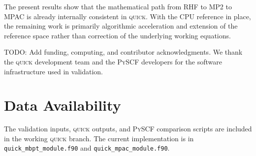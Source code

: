 \documentclass[aip,jcp,reprint,superscriptaddress]{revtex4-2}
\newcommand{\quick}{\textsc{quick}}
\newcommand{\pyscf}{\textsc{PySCF}}
\newcommand{\keyword}[1]{\texttt{#1}}
\begin{document}
The present results show that the mathematical path from RHF to MP2 to MPAC is already internally consistent in \quick{}.  With the CPU reference in place, the remaining work is primarily algorithmic acceleration and extension of the reference space rather than correction of the underlying working equations.

\begin{acknowledgments}
TODO: Add funding, computing, and contributor acknowledgments.  We thank the \quick{} development team and the \pyscf{} developers for the software infrastructure used in validation.
\end{acknowledgments}

\section*{Data Availability}

The validation inputs, \quick{} outputs, and \pyscf{} comparison scripts are included in the working \quick{} branch.  The current implementation is in \keyword{quick\_mbpt\_module.f90} and \keyword{quick\_mpac\_module.f90}.


\end{document}
